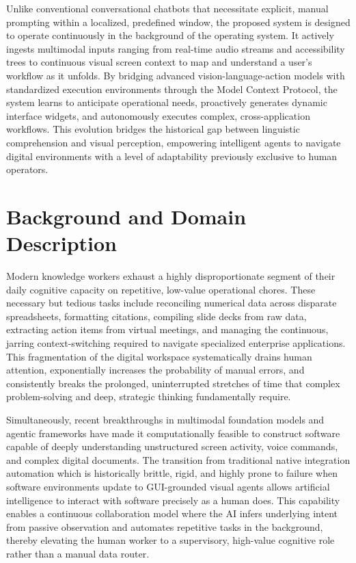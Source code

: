 \documentclass[12pt, a4paper]{report}
\begin{document}
Unlike conventional conversational chatbots that necessitate explicit, manual prompting within a localized, predefined window, the proposed system is designed to operate continuously in the background of the operating system.\cite{hojo2025} It actively ingests multimodal inputs ranging from real-time audio streams and accessibility trees to continuous visual screen context to map and understand a user's workflow as it unfolds.\cite{hojo2025} By bridging advanced vision-language-action models with standardized execution environments through the Model Context Protocol, the system learns to anticipate operational needs, proactively generates dynamic interface widgets, and autonomously executes complex, cross-application workflows.\cite{hojo2025} This evolution bridges the historical gap between linguistic comprehension and visual perception, empowering intelligent agents to navigate digital environments with a level of adaptability previously exclusive to human operators.\cite{openreview2026}

\section{Background and Domain Description}
Modern knowledge workers exhaust a highly disproportionate segment of their daily cognitive capacity on repetitive, low-value operational chores.\cite{hojo2025} These necessary but tedious tasks include reconciling numerical data across disparate spreadsheets, formatting citations, compiling slide decks from raw data, extracting action items from virtual meetings, and managing the continuous, jarring context-switching required to navigate specialized enterprise applications.\cite{hojo2025} This fragmentation of the digital workspace systematically drains human attention, exponentially increases the probability of manual errors, and consistently breaks the prolonged, uninterrupted stretches of time that complex problem-solving and deep, strategic thinking fundamentally require.\cite{hojo2025}

Simultaneously, recent breakthroughs in multimodal foundation models and agentic frameworks have made it computationally feasible to construct software capable of deeply understanding unstructured screen activity, voice commands, and complex digital documents.\cite{hojo2025} The transition from traditional native integration automation which is historically brittle, rigid, and highly prone to failure when software environments update to GUI-grounded visual agents allows artificial intelligence to interact with software precisely as a human does.\cite{openreview2026} This capability enables a continuous collaboration model where the AI infers underlying intent from passive observation and automates repetitive tasks in the background, thereby elevating the human worker to a supervisory, high-value cognitive role rather than a manual data router.\cite{hojo2025}
\end{document}
